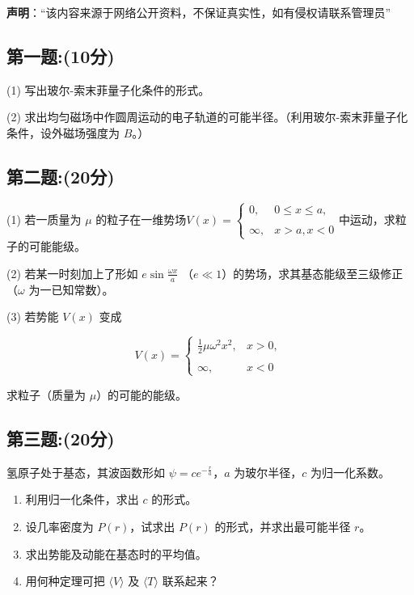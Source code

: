 
\textbf{声明}：“该内容来源于网络公开资料，不保证真实性，如有侵权请联系管理员”

\subsection{第一题:(10分)}
(1) 写出玻尔-索末菲量子化条件的形式。

(2) 求出均匀磁场中作圆周运动的电子轨道的可能半径。（利用玻尔-索末菲量子化条件，设外磁场强度为 $B$。）
\subsection{第二题:(20分)}
(1) 若一质量为 $\mu$ 的粒子在一维势场$V(x) =\begin{cases}    0, & 0 \leq x \leq a, \\\\    \infty, & x > a , x < 0\end{cases}$中运动，求粒子的可能能级。

(2) 若某一时刻加上了形如 $e \sin  \frac{\omega x}{a} $ （$e \ll 1$）的势场，求其基态能级至三级修正（$\omega$ 为一已知常数）。

(3) 若势能 $V(x)$ 变成

$$V(x) =\begin{cases}    \frac{1}{2} \mu \omega^2 x^2, & x > 0, \\\\    \infty, & x < 0\end{cases}~$$

求粒子（质量为 $\mu$）的可能的能级。
\subsection{第三题:(20分)}
氢原子处于基态，其波函数形如 $\psi = c e^{-\frac{r}{a}}$，$a$ 为玻尔半径，$c$ 为归一化系数。

\begin{enumerate}
    \item 利用归一化条件，求出 $c$ 的形式。
    \item 设几率密度为 $P(r)$，试求出 $P(r)$ 的形式，并求出最可能半径 $r$。
    \item 求出势能及动能在基态时的平均值。
    \item 用何种定理可把 $\langle V \rangle$ 及 $\langle T \rangle$ 联系起来？
\end{enumerate}